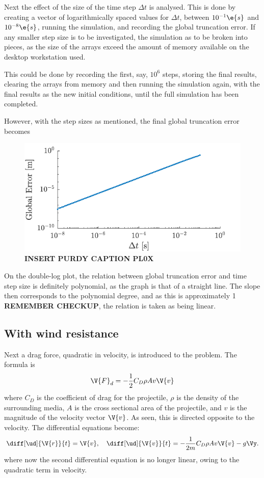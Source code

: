 \documentclass[a4paper,10pt]{article} 	%
\numberwithin{equation}{section}
\begin{document}
	
	Next the effect of the size of the time step $ \Delta t $ is analysed. This is done by creating a vector of logarithmically spaced values for $ \Delta t $, between $ 10^{-1} \e{s} $ and $ 10^{-8} \e{s}$, running the simulation, and recording the global truncation error. If any smaller step size is to be investigated, the simulation as to be broken into pieces, as the size of the arrays exceed the amount of memory available on the desktop workstation used.
	
	This could be done by recording the first, say, $ 10^6 $ steps, storing the final results, clearing the arrays from memory and then running the simulation again, with the final results as the new initial conditions, until the full simulation has been completed.
	
	However, with the step sizes as mentioned, the final global truncation error becomes
	\begin{figure}[H]
		\centering
		\includegraphics[width=0.5\linewidth]{projError.pdf}
		\caption{\textbf{INSERT PURDY CAPTION PL0X}}
		\label{fig:projError}
	\end{figure}
	On the double-log plot, the relation between global truncation error and time step size is definitely polynomial, as the graph is that of a straight line. The slope then corresponds to the polynomial degree, and as this is approximately 1 \textbf{REMEMBER CHECKUP}, the relation is taken as being linear.
	
	\subsection{With wind resistance}
	Next a drag force, quadratic in velocity, is introduced to the problem. The formula is
	\begin{equation}
		\V{F}_d = -\frac{1}{2}C_D \rho A v \V{v}
 	\end{equation} 
 	where $ C_D $ is the coefficient of drag for the projectile, $ \rho $ is the density of the surrounding media, $ A $ is the cross sectional area of the projectile, and $ v $ is the magnitude of the velocity vector $ \V{v} $. As seen, this is directed opposite to the velocity. The differential equations become:
 	\begin{equation}
 			\diff[\ud]{\V{r}}{t} = \V{v}, \quad \diff[\ud]{\V{v}}{t} = -\frac{1}{2m}C_D \rho A v \V{v} -g\Vy.
 	\end{equation}
 	where now the second differential equation is no longer linear, owing to the quadratic term in velocity.
 	
\end{document}
